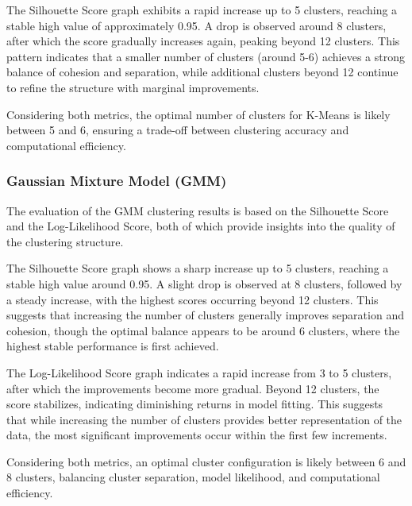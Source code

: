             The Silhouette Score graph exhibits a rapid increase up to 5 clusters, reaching a stable high value of approximately 0.95. A drop is observed around 8 clusters, after which the score gradually increases again, peaking beyond 12 clusters. This pattern indicates that a smaller number of clusters (around 5-6) achieves a strong balance of cohesion and separation, while additional clusters beyond 12 continue to refine the structure with marginal improvements.

            Considering both metrics, the optimal number of clusters for K-Means is likely between 5 and 6, ensuring a trade-off between clustering accuracy and computational efficiency.
        
        \subsubsection{Gaussian Mixture Model (GMM) \\}

            The evaluation of the GMM clustering results is based on the Silhouette Score and the Log-Likelihood Score, both of which provide insights into the quality of the clustering structure.

            The Silhouette Score graph shows a sharp increase up to 5 clusters, reaching a stable high value around 0.95. A slight drop is observed at 8 clusters, followed by a steady increase, with the highest scores occurring beyond 12 clusters. This suggests that increasing the number of clusters generally improves separation and cohesion, though the optimal balance appears to be around 6 clusters, where the highest stable performance is first achieved.

            The Log-Likelihood Score graph indicates a rapid increase from 3 to 5 clusters, after which the improvements become more gradual. Beyond 12 clusters, the score stabilizes, indicating diminishing returns in model fitting. This suggests that while increasing the number of clusters provides better representation of the data, the most significant improvements occur within the first few increments.

            Considering both metrics, an optimal cluster configuration is likely between 6 and 8 clusters, balancing cluster separation, model likelihood, and computational efficiency.


